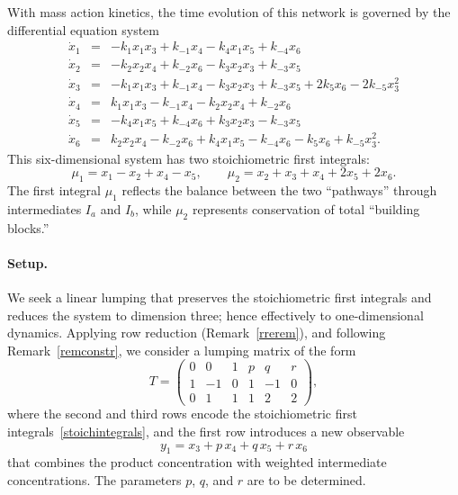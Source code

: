 \documentclass{article}
\begin{document}
With mass action kinetics, the time evolution of this network is governed by the differential equation system
\begin{equation}\label{replicationsys}
\begin{array}{rcl}
\dot x_1 & =& -k_1x_1x_3+ k_{-1} x_4 -k_4x_1x_5 +k_{-4}x_6\\[2pt]
\dot x_2 &= & -k_2x_2x_4 +k_{-2}x_6-k_3x_2x_3+k_{-3} x_5\\[2pt]
\dot x_3&=&  -k_1x_1x_3+ k_{-1} x_4 -k_3x_2x_3+k_{-3} x_5 + 2k_5x_6-2k_{-5}x_3^2 \\[2pt]
\dot x_4&=& k_1x_1x_3- k_{-1} x_4  -k_2x_2x_4 +k_{-2}x_6\\[2pt]
\dot x_5&=&-k_4x_1x_5 +k_{-4}x_6+k_3x_2x_3-k_{-3} x_5   \\[2pt]
\dot x_6&=&k_2x_2x_4 -k_{-2}x_6+k_4x_1x_5 -k_{-4}x_6- k_5x_6+k_{-5}x_3^2.
\end{array}
\end{equation}
This six-dimensional system has two stoichiometric first integrals:
\begin{equation}\label{stoichintegrals}
\mu_1 = x_1 - x_2 + x_4 - x_5, \qquad \mu_2 = x_2 + x_3 + x_4 + 2x_5 + 2x_6.
\end{equation}
The first integral $\mu_1$ reflects the balance between the two ``pathways'' through 
intermediates $I_a$ and $I_b$, while $\mu_2$ represents conservation of total 
``building blocks.''

\paragraph{Setup.}
We seek a linear lumping that preserves the stoichiometric first integrals and reduces 
the system to dimension three; hence effectively to one-dimensional dynamics. Applying row reduction (Remark~\ref{rrerem}), and following Remark~\ref{remconstr},
we consider a lumping matrix of the form
\begin{equation}\label{replumpT}
T = \begin{pmatrix}
0 & 0 & 1 & p & q & r \\
1 & -1 & 0 & 1 & -1 & 0 \\
0 & 1 & 1 & 1 & 2 & 2
\end{pmatrix},
\end{equation}
where the second and third rows encode the stoichiometric first 
integrals~\eqref{stoichintegrals}, and the first row introduces a new observable
\[
y_1 = x_3 + p\, x_4 + q\, x_5 + r\, x_6
\]
that combines the product concentration with weighted intermediate concentrations. 
The parameters $p$, $q$, and $r$ are to be determined.
\end{document}
